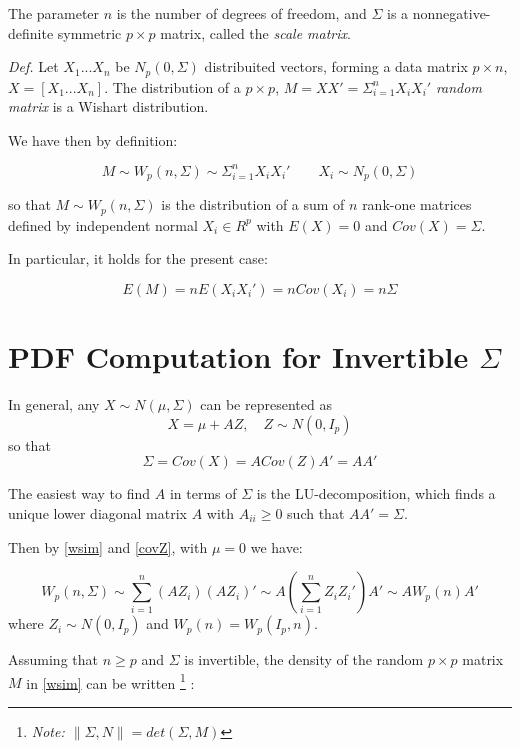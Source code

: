 \documentclass[12pt,openright,twoside,a4paper]{book}
\begin{document}
The parameter $n$ is the number of degrees of freedom, and $\Sigma$ is a nonnegative-definite symmetric $p\times p$ matrix, called the \textit{scale matrix}.


\textit{Def.} Let $X_1...X_n$ be $N_p(0,\Sigma)$ distribuited vectors, forming a data matrix $p\times n$, $X=[X_1...X_n]$.
The distribution of  a $p\times p$, $M=XX'=\Sigma^n_{i=1}X_iX_i'$ \textit{random matrix}  is a Wishart distribution. \cite{AMS}

We have then by definition:

\begin{equation}
M\sim W_p(n, \Sigma)\sim\Sigma^n_{i=1}X_iX_i' \qquad X_i\sim N_p(0,\Sigma)   
\label{wsim}
\end{equation}


so that $M\sim W_p(n, \Sigma)$  is the distribution of a sum of $n$ rank-one matrices defined by independent normal $X_i \in R^p$ with $E(X)=0$ and $Cov(X)=\Sigma$.

In particular, it holds for the present case:

\begin{equation}
E(M)=nE(X_iX_i') = nCov(X_i) = n\Sigma
\end{equation}

\section{PDF Computation for Invertible $\Sigma$}

In general, any $X\sim N(\mu,\Sigma)$ can be represented as
\begin{equation}
X=\mu + AZ,\quad Z\sim N(0,I_p)
\end{equation}
so that
\begin{equation}
\Sigma= Cov(X) = A Cov(Z)A' = AA'
\label{covZ}
\end{equation}


The easiest way to find $ A$ in terms of $\Sigma$ is the LU-decomposition, which finds a unique lower diagonal matrix $A$ with $A_{ii} \geqslant 0 $ such that $AA' = \Sigma$.

Then by \ref{wsim} and \ref{covZ}, with $\mu=0$ we have:

\begin{equation}
W_p(n, \Sigma)\sim \sum_{i=1}^n(AZ_i)(AZ_i)'\sim A(\sum_{i=1}^nZ_iZ_i')A'\sim AW_p(n)A'
\end{equation}
where $Z_i\sim N(0, I_p)$ and $W_p(n)=W_p(I_p,n)$. 

Assuming that  $n\geq p$ and $\Sigma$ is invertible, the density of the random $p\times p $ matrix $M$ in \ref{wsim} can be written \footnote{\textit{Note: $\|\Sigma , N \| = det (\Sigma , M)$}} :
\end{document}
